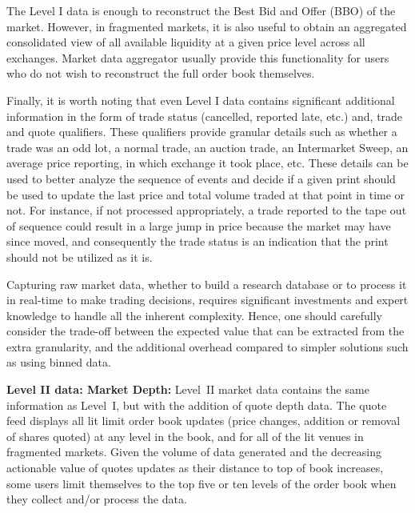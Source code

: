 The Level I data is enough to reconstruct the Best Bid and Offer (BBO) of the market. However, in fragmented markets, it is also useful to obtain an aggregated consolidated view of all available liquidity at a given price level across all exchanges. Market data aggregator usually provide this functionality for users who do not wish to reconstruct the full order book themselves. 


Finally, it is worth noting that even Level I data contains significant additional information in the form of trade status (cancelled, reported late, etc.) and, trade and quote qualifiers. These qualifiers provide granular details such as whether a trade was an odd lot, a normal trade, an auction trade, an Intermarket Sweep, an average price reporting, in which exchange it took place, etc. These details can be used to better analyze the sequence of events and decide if a given print should be used to update the last price and total volume traded at that point in time or not. For instance, if not processed appropriately, a trade reported to the tape out of sequence could result in a large jump in price because the market may have since moved, and consequently the trade status is an indication that the print should not be utilized as it is.


Capturing raw market data, whether to build a research database or to process it in real-time to make trading decisions, requires significant investments and expert knowledge to handle all the inherent complexity. Hence, one should carefully consider the trade-off between the expected value that can be extracted from the extra granularity, and the additional overhead compared to simpler solutions such as using binned data. \twomedskip


\noindent\textbf{Level II data: Market Depth:}  Level~II market data contains the same information as Level~I, but with the addition of quote depth data. The quote feed displays all lit limit order book updates (price changes, addition or removal of shares quoted) at any level in the book, and for all of the lit venues in fragmented markets. Given the volume of data generated and the decreasing actionable value of quotes updates as their distance to top of book increases, some users limit themselves to the top five or ten levels of the order book  when they collect and/or process the data. \twomedskip


